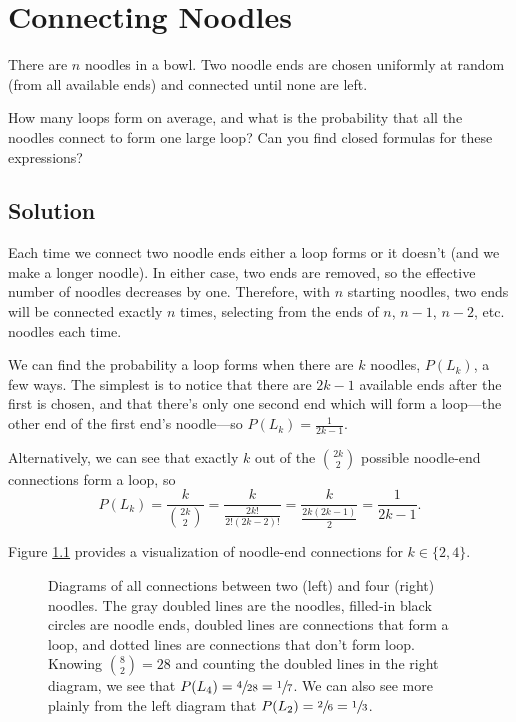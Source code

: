\documentclass{book}
\begin{document}
\chapter{Connecting Noodles}
There are $n$ noodles in a bowl. Two noodle ends are chosen uniformly at random (from all available ends)
and connected until none are left.

\begin{question*}
  How many loops form on average, and
  what is the probability that all the noodles connect to form one large loop? Can you find closed formulas for these expressions?
  \end{question*}

\section{Solution}
Each time we connect two noodle ends either a loop forms or it doesn't (and we make a longer noodle). In either case, two ends are removed,
so the effective number of noodles decreases by one. Therefore, with $n$ starting noodles, two ends will be connected exactly $n$ times, selecting
from the ends of $n$, $n-1$, $n-2$, etc. noodles each time.

We can find the probability a loop forms when there are $k$ noodles, $P(L_k)$, a few ways. The simplest is to notice that there are $2k-1$ available ends after the first is chosen, and that there's only one second end which will form a loop---the other end of
the first end's noodle---so $P(L_k)=\frac{1}{2k-1}$.

Alternatively, we can see that exactly $k$ out of the $\binom{2k}{2}$ possible noodle-end connections form a loop, so
\begin{equation}\label{plk}
P(L_k)=\frac{k}{\binom{2k}{2}} = \frac{k}{\frac{2k!}{2!(2k-2)!}} = \frac{k}{\frac{2k(2k-1)}{2}} = \frac{1}{2k-1}.
\end{equation}

Figure \ref{fig1} provides a visualization of noodle-end connections for $k\in\{2,4\}$.

\begin{figure}[h]
  \centering
{}
\caption{Diagrams of all connections between two (left) and four (right) noodles. The gray doubled lines are the noodles, filled-in black circles
  are noodle ends, doubled lines are connections that form a loop, and dotted lines are connections that don't form loop. Knowing $\binom{8}{2} = 28$ and counting the doubled lines in the right diagram, we see that $P(L_4)=\sfrac{4}{28}=\sfrac{1}{7}$. We can also see more plainly from the left diagram that $P(L_2)=\sfrac{2}{6}=\sfrac{1}{3}$.
}
\label{fig1}
\end{figure}
\end{document}
